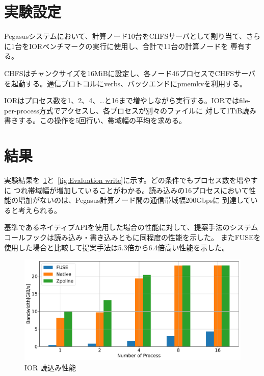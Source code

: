 \documentclass[a4paper,11pt]{jreport}
\begin{document}
\section{実験設定}
Pegasusシステムにおいて、計算ノード10台をCHFSサーバとして割り当て、さらに1台をIORベンチマークの実行に使用し、合計で11台の計算ノードを
専有する。

CHFSはチャンクサイズを16MiBに設定し、各ノード46プロセスでCHFSサーバを起動する。通信プロトコルにverbs、バックエンドにpmemkvを利用する。

IORはプロセス数を1、2、4、…と16まで増やしながら実行する。IORではfile-per-process方式でアクセスし、各プロセスが別々のファイルに
対して1TiB読み書きする。この操作を5回行い、帯域幅の平均を求める。
\section{結果}

実験結果を\figurename~\ref{fig:Evaluation read}と\figurename~\ref{fig:Evaluation write}に示す。どの条件でもプロセス数を増やすに
つれ帯域幅が増加していることがわかる。読み込みの16プロセスにおいて性能の増加がないのは、Pegasus計算ノード間の通信帯域幅200Gbpsに
到達していると考えられる。

基準であるネイティブAPIを使用した場合の性能に対して、提案手法のシステムコールフックは読み込み・書き込みともに同程度の性能を示した。
またFUSEを使用した場合と比較して提案手法は5.3倍から6.4倍高い性能を示した。

\newpage

\begin{figure}[h]
	\begin{minipage}[b]{1\columnwidth}
		\centering
		\includegraphics[width=0.9\linewidth]{./figure/ior_benchmark_read.pdf}
		\caption{IOR 読込み性能}
		\label{fig:Evaluation read}
	\end{minipage}
\end{figure}
\end{document}
